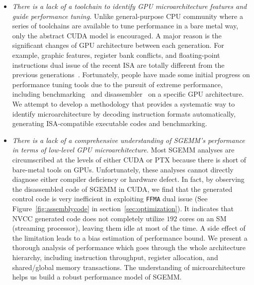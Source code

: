 \begin{itemize}
\item {\em There is a lack of a toolchain to identify GPU microarchitecture features and guide performance tuning.}
    Unlike general-purpose CPU community where a series of toolchains are available to tune performance in a bare metal
        way, only the abstract CUDA model is encouraged. A major reason is the significant changes of GPU architecture
        between each generation. For example, graphic features, register bank conflicts, and floating-point 
instructions dual
        issue of the recent ISA are totally different from the previous generations~\cite{fermi}. Fortunately, people 
have made
        some initial progress on performance tuning tools due to the pursuit of extreme performance, including
        benchmarking~\cite{mei, volkov, wong} and disassembler~\cite{asfermi,bernstein2012usable,decuda,maxas} on a 
specific GPU architecture. We attempt to develop a methodology that provides a systematic way to identify 
microarchitecture by decoding instruction formats automatically, generating ISA-compatible executable codes and 
benchmarking.
\item {\em There is a lack of a comprehensive understanding of SGEMM's performance in terms of low-level GPU 
microarchitecture.} Most SGEMM analyses are circumscribed at the levels of either CUDA or PTX because there is short of 
bare-metal tools on GPUs. Unfortunately, these analyses cannot directly diagnose either compiler deficiency or hardware 
defect. In fact, by observing the disassembled code of SGEMM in CUDA, we find that the generated control code is very 
inefficient in exploiting {\tt FFMA} dual issue (See Figure~\ref{fig:assemblycode} in section~\ref{sec:optimization}). 
It indicates that NVCC generated code does not completely utilize $192$ cores on an SM (streaming processor), leaving 
them idle at most of the time. A side effect of the limitation leads to a bias estimation of performance bound. We 
present a thorough analysis of performance which goes through the whole architecture hierarchy, including instruction 
throughput, register allocation, and shared/global memory transactions. The understanding of microarchitecture helps us 
build a robust performance model of SGEMM.
\end{itemize}

